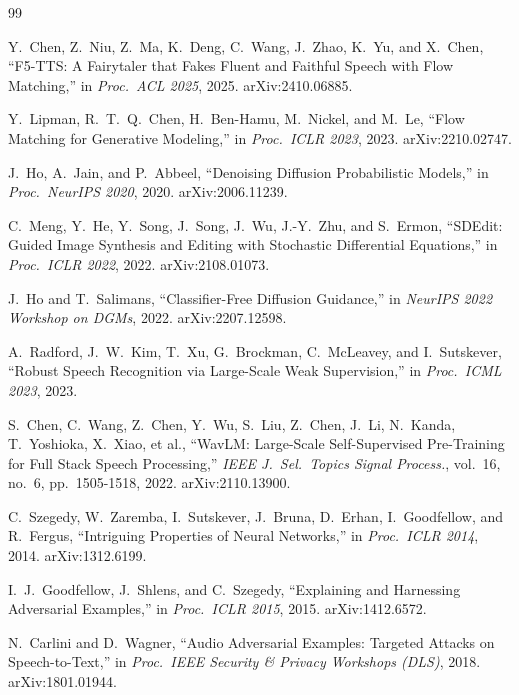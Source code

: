 \documentclass[11pt,a4paper,twocolumn]{article}
\begin{document}
\clearpage
\begin{thebibliography}{99}

Y.\ Chen, Z.\ Niu, Z.\ Ma, K.\ Deng, C.\ Wang, J.\ Zhao,
K.\ Yu, and X.\ Chen,
``F5-TTS: A Fairytaler that Fakes Fluent and Faithful Speech
with Flow Matching,''
in \textit{Proc.\ ACL 2025}, 2025.
arXiv:2410.06885.

Y.\ Lipman, R.\ T.\ Q.\ Chen, H.\ Ben-Hamu, M.\ Nickel,
and M.\ Le,
``Flow Matching for Generative Modeling,''
in \textit{Proc.\ ICLR 2023}, 2023.
arXiv:2210.02747.

J.\ Ho, A.\ Jain, and P.\ Abbeel,
``Denoising Diffusion Probabilistic Models,''
in \textit{Proc.\ NeurIPS 2020}, 2020.
arXiv:2006.11239.

C.\ Meng, Y.\ He, Y.\ Song, J.\ Song, J.\ Wu,
J.-Y.\ Zhu, and S.\ Ermon,
``SDEdit: Guided Image Synthesis and Editing with
Stochastic Differential Equations,''
in \textit{Proc.\ ICLR 2022}, 2022.
arXiv:2108.01073.

J.\ Ho and T.\ Salimans,
``Classifier-Free Diffusion Guidance,''
in \textit{NeurIPS 2022 Workshop on DGMs}, 2022.
arXiv:2207.12598.

A.\ Radford, J.\ W.\ Kim, T.\ Xu, G.\ Brockman, C.\ McLeavey,
and I.\ Sutskever,
``Robust Speech Recognition via Large-Scale Weak Supervision,''
in \textit{Proc.\ ICML 2023}, 2023.

S.\ Chen, C.\ Wang, Z.\ Chen, Y.\ Wu, S.\ Liu, Z.\ Chen,
J.\ Li, N.\ Kanda, T.\ Yoshioka, X.\ Xiao, et al.,
``WavLM: Large-Scale Self-Supervised Pre-Training for Full
Stack Speech Processing,''
\textit{IEEE J.\ Sel.\ Topics Signal Process.},
vol.\ 16, no.\ 6, pp.\ 1505-1518, 2022.
arXiv:2110.13900.

C.\ Szegedy, W.\ Zaremba, I.\ Sutskever, J.\ Bruna,
D.\ Erhan, I.\ Goodfellow, and R.\ Fergus,
``Intriguing Properties of Neural Networks,''
in \textit{Proc.\ ICLR 2014}, 2014.
arXiv:1312.6199.

I.\ J.\ Goodfellow, J.\ Shlens, and C.\ Szegedy,
``Explaining and Harnessing Adversarial Examples,''
in \textit{Proc.\ ICLR 2015}, 2015.
arXiv:1412.6572.

N.\ Carlini and D.\ Wagner,
``Audio Adversarial Examples: Targeted Attacks on Speech-to-Text,''
in \textit{Proc.\ IEEE Security \& Privacy Workshops (DLS)}, 2018.
arXiv:1801.01944.


\end{thebibliography}
\end{document}
